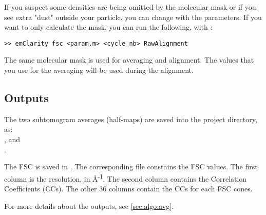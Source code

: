 If you suspect some densities are being omitted by the molecular mask or if you see extra "dust" outside your particle, you can change with the  parameters. If you want to only calculate the mask, you can run the following, with :
\begin{lstlisting}
>> emClarity fsc <param.m> <cycle_nb> RawAlignment
\end{lstlisting}
The same molecular mask is used for averaging and alignment. The values that you use for the averaging will be used during the alignment.

\newpage
\subsection{Outputs}

The two subtomogram averages (half-maps) are saved into the project directory, as:\\ , and\\ .

The FSC is saved in . The corresponding  file constains the FSC values. The first column is the resolution, in \si{\angstrom}\textsuperscript{-1}. The second column contains the Correlation Coefficients (CCs). The other 36 columns contain the CCs for each FSC cones.

For more details about the outputs, see \ref{sec:algo:avg}.